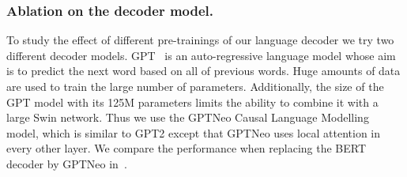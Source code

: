 \documentclass[runningheads,table]{llncs}
\newcommand{\modelName}{VASTA\xspace}
\begin{document}
\begin{table*}
    \caption{Influence of the difference inference method on \modelName{} model.}\label{tab:ablations_inference}
\end{table*}




\subsubsection{Ablation on the decoder model.}\label{tab:ablation}
To study the effect of different pre-trainings of our language decoder we try two different decoder models.
GPT~\cite{radford2018improving} is an auto-regressive language model whose aim is to predict the next word based on all of previous words.
Huge amounts of data are used to train the large number of parameters.
Additionally, the size of the GPT model with its 125M parameters limits the ability to combine it with a large Swin network.
Thus we use the GPTNeo Causal Language Modelling~\cite{black2021gpt} model, which is similar to GPT2 except that GPTNeo uses local attention in every other layer.
We compare the performance when replacing the BERT decoder by GPTNeo in~.
\end{document}
